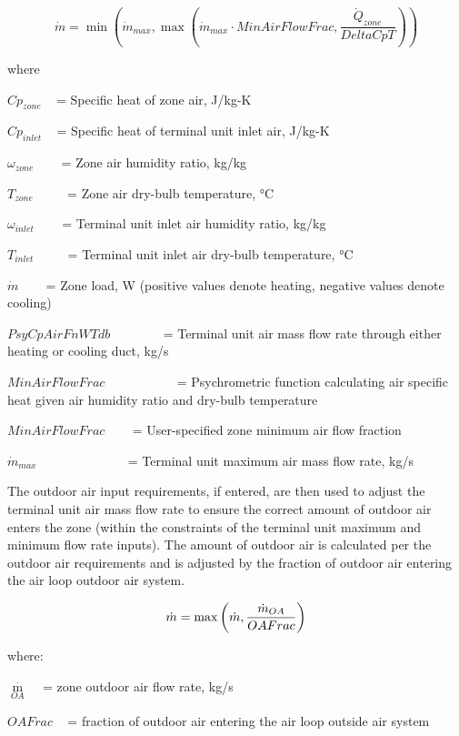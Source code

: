 \begin{equation}
\dot m = \min \left( \dot m_{max}, \max \left( \dot m_{max}\cdot MinAirFlowFrac,\frac{\dot Q_{zone}}{DeltaCpT} \right) \right)
\end{equation}

where

\(C{p_{zone}}\) ~ = Specific heat of zone air, J/kg-K

\(C{p_{inlet}}\) ~ = Specific heat of terminal unit inlet air, J/kg-K

\({\omega_{zone}}\) ~~~ = Zone air humidity ratio, kg/kg

\({T_{zone}}\) ~~~~ = Zone air dry-bulb temperature, °C

\({\omega_{inlet}}\) ~~~ = Terminal unit inlet air humidity ratio, kg/kg

\({T_{inlet}}\) ~~~~ = Terminal unit inlet air dry-bulb temperature, °C

\(\dot m\) ~~~ = Zone load, W (positive values denote heating, negative values denote cooling)

\(PsyCpAirFnWTdb\) ~~~~~~~ = Terminal unit air mass flow rate through either heating or cooling duct, kg/s

\(MinAirFlowFrac\) ~~~~~~~~~~ = Psychrometric function calculating air specific heat given air humidity ratio and dry-bulb temperature

\(MinAirFlowFrac\) ~~~ = User-specified zone minimum air flow fraction

\({\dot m_{max}}\) ~~~~~~~~~~~~~ = Terminal unit maximum air mass flow rate, kg/s

The outdoor air input requirements, if entered, are then used to adjust the terminal unit air mass flow rate to ensure the correct amount of outdoor air enters the zone (within the constraints of the terminal unit maximum and minimum flow rate inputs). The amount of outdoor air is calculated per the outdoor air requirements and is adjusted by the fraction of outdoor air entering the air loop outdoor air system.

\begin{equation}
  \dot{m} = \max\left( \dot{m}, \frac{\dot{m}_{OA}}{OAFrac} \right)
\end{equation}

where:

\({\mathop m\limits^\cdot_{OA}}\) ~ = zone outdoor air flow rate, kg/s

\(OAFrac\) ~ = fraction of outdoor air entering the air loop outside air system

